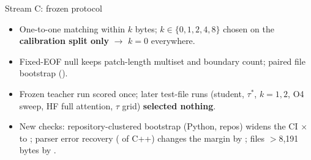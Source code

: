 \documentclass[aspectratio=169,11pt]{beamer}
\newcommand{\hl}[1]{\textcolor{acc}{\textbf{#1}}}
\begin{document}
\begin{frame}{Stream C: frozen protocol}
\begin{itemize}
\item One-to-one matching within $k$ bytes; $k\in\{0,1,2,4,8\}$ chosen on the \hl{calibration split only} $\rightarrow$ $k=0$ everywhere.
\item Fixed-EOF null keeps patch-length multiset and boundary count; paired file bootstrap (\nBoot{}).
\item Frozen teacher run scored once; later test-file runs (student, $\tau^*$, $k=1,2$, O4 sweep, HF full attention, $\tau$ grid) \hl{selected nothing}.
\item New checks: repository-clustered bootstrap (Python, \xRepoN{} repos) widens the CI \xRepoWiden{}$\times$ to \xRepoCI{}; parser error recovery (\xErrShare{} of C++) changes the margin by \xErrDiff{} \xErrDiffCI{}; files $>$8{,}191 bytes by \xLongDiff{} \xLongDiffCI{}.
\end{itemize}
\end{frame}
\end{document}
